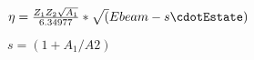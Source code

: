 \documentclass{article}
\begin{document}
$ \eta=\frac{Z_1Z_2\sqrt{A_1}}{6.34977} * \sqrt(Ebeam - s\cdotEstate) $
\pagebreak

$ s = (1 + A_1/A2)$
\pagebreak
\end{document}
